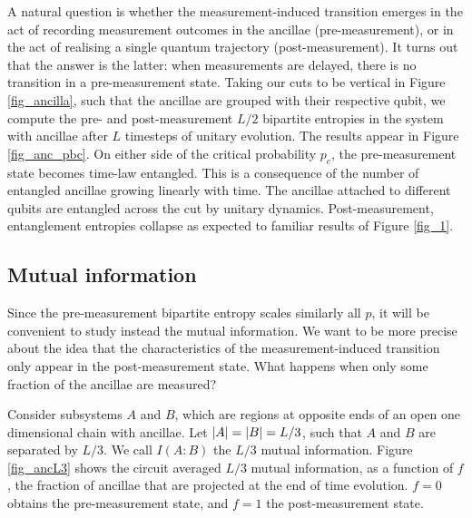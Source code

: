\documentclass[10pt]{article}
\begin{document}
A natural question is whether the measurement-induced transition emerges in the act of recording measurement outcomes in the ancillae (pre-measurement), or in the act of realising a single quantum trajectory (post-measurement). It turns out that the answer is the latter: when measurements are delayed, there is no transition in a pre-measurement state. Taking our cuts to be vertical in Figure \ref{fig_ancilla}, such that the ancillae are grouped with their respective qubit, we compute the pre- and post-measurement $L/2$ bipartite entropies in the system with ancillae after $L$ timesteps of unitary evolution. The results appear in Figure \ref{fig_anc_pbc}. On either side of the critical probability $p_c$, the pre-measurement state becomes time-law entangled. This is a consequence of the number of entangled ancillae growing linearly with time. The ancillae attached to different qubits are entangled across the cut by unitary dynamics. Post-measurement, entanglement entropies collapse as expected to familiar results of Figure \ref{fig_1}. 





\subsection{Mutual information}

Since the pre-measurement bipartite entropy scales similarly all $p$, it will be convenient to study instead the mutual information. We want to be more precise about the idea that the characteristics of the measurement-induced transition only appear in the post-measurement state.  What happens when only some fraction of the ancillae are measured?

Consider subsystems $A$ and $B$, which are regions at opposite ends of an open one dimensional chain with ancillae. Let $\abs{A}=\abs{B}=L/3$, such that $A$ and $B$ are separated by $L/3$. We call $I(A:B)$ the $L/3$ mutual information. Figure \ref{fig_ancL3} shows the circuit averaged $L/3$ mutual information, as a function of $f$, the fraction of ancillae that are projected at the end of time evolution. $f=0$ obtains the pre-measurement state, and $f=1$ the post-measurement state.

\end{document}
